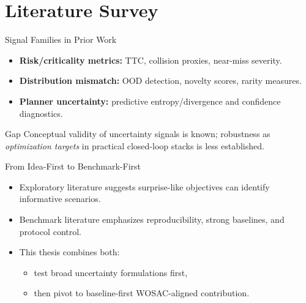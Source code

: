 \section{Literature Survey}

\begin{frame}{Signal Families in Prior Work}
\begin{itemize}
    \item \textbf{Risk/criticality metrics:} TTC, collision proxies, near-miss severity.
    \item \textbf{Distribution mismatch:} OOD detection, novelty scores, rarity measures.
    \item \textbf{Planner uncertainty:} predictive entropy/divergence and confidence diagnostics.
\end{itemize}
\vspace{0.4em}
\begin{block}{Gap}
Conceptual validity of uncertainty signals is known; robustness as \emph{optimization targets} in practical closed-loop stacks is less established.
\end{block}
\end{frame}

\begin{frame}{From Idea-First to Benchmark-First}
\begin{itemize}
    \item Exploratory literature suggests surprise-like objectives can identify informative scenarios.
    \item Benchmark literature emphasizes reproducibility, strong baselines, and protocol control.
    \item This thesis combines both:
    \begin{itemize}
        \item test broad uncertainty formulations first,
        \item then pivot to baseline-first WOSAC-aligned contribution.
    \end{itemize}
\end{itemize}
\end{frame}
